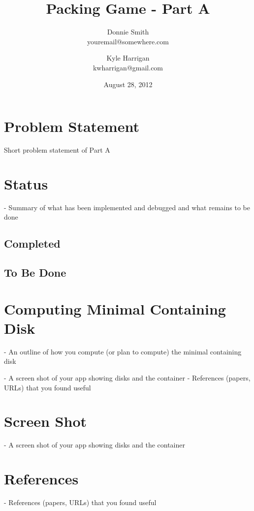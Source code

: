 \documentclass[a4paper]{article}
\title{Packing Game - Part A}
\author{
Donnie Smith \\
youremail@somewhere.com
  \and 
Kyle Harrigan \\
kwharrigan@gmail.com
}
\date{August 28, 2012}                                           %
\begin{document}
\maketitle

 \section{Problem Statement}
  
 Short problem statement of Part A
 
 \section{Status}
  - Summary of what has been implemented and debugged and what remains to be done
  
 \subsection{Completed}
 
 \subsection{To Be Done}
 
\section{Computing Minimal Containing Disk}

 - An outline of how you compute (or plan to compute) the minimal containing disk
 
 - A screen shot of your app showing disks and the container
 - References (papers, URLs) that you found useful

\section{Screen Shot}
 - A screen shot of your app showing disks and the container
 
 \section{References}
  - References (papers, URLs) that you found useful
 
\end{document}
